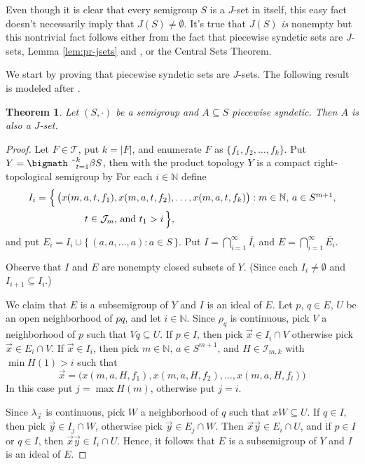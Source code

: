 \documentclass[12pt,showtrims]{memoir}
\theoremstyle{plain}
\newtheorem{thm}{Theorem}[section]
\theoremstyle{definition}
\newcommand{\bbN}{\mathbb{N}}
\newcommand{\calI}{\mathcal{I}}
\newcommand{\calJ}{\mathcal{J}}
\newcommand{\calT}{\mathcal{T}}
\newcommand{\bigtimes}{\hbox{\bigmath \char'2}}
\begin{document}
Even though it is clear that every semigroup $S$ is a $J$-set in itself, this easy fact doesn't necessarily imply that $J(S) \ne \emptyset$.
It's true that $J(S)$ \emph{is} nonempty but this nontrivial fact follows either from the fact that piecewise syndetic sets are $J$-sets, Lemma \ref{lem:pr-jsets} and \cite[Theorem 3.11]{Hindman:1998fk}, or the Central Sets Theorem. 

We start by proving that piecewise syndetic sets are $J$-sets.
The following result is modeled after \cite[Theorems 14.1 and 14.7]{Hindman:1998fk}. 

\begin{thm}
  Let $(S, \cdot)$ be a semigroup and $A \subseteq S$ piecewise syndetic.
  Then $A$ is also a $J$-set.
\end{thm}
\begin{proof}
  Let $F \in \calT$, put $k = |F|$, and enumerate $F$ as $\{f_1, f_2, \ldots, f_k\}$.
  Put $Y = \bigtimes_{t=1}^k \beta S$, then with the product topology $Y$ is a compact right-topological semigroup by \cite[Theorem 2.22]{Hindman:1998fk}
  For each $i \in \bbN$ define
  \begin{align*}
    I_i &= \Bigl\{\, \bigl( x(m, a, t, f_1), x(m, a, t, f_2), \ldots,
    x(m, a, t, f_k) \bigr) : \mbox{$m \in \bbN$, $a \in S^{m+1}$,} \\
    &\hspace{5em} \mbox{$t \in \calJ_m$, and $t_1 > i$}
    \,\Bigr\},
  \end{align*}
  and put $E_i = I_i \cup \{\, (a, a, \ldots, a) : a \in S \,\}$.
  Put $I = \bigcap_{i=1}^\infty \overline{I_i}$ and $E = \bigcap_{i=1}^\infty \overline{E_i}$.

  Observe that $I$ and $E$ are nonempty closed subsets of $Y$.
  (Since each $I_i \ne \emptyset$ and $I_{i+1} \subseteq I_i$.)

  We claim that $E$ is a subsemigroup of $Y$ and $I$ is an ideal of $E$.
  Let $p$, $q \in E$, $U$ be an open neighborhood of $pq$, and let $i \in \bbN$. 
  Since $\rho_q$ is continuous, pick $V$ a neighborhood of $p$ such that $Vq \subseteq U$. 
  If $p \in I$, then pick $\vec{x} \in I_i \cap V$ otherwise pick $\vec{x} \in E_i \cap V$.
  If $\vec{x} \in I_i$, then pick $m \in \bbN$, $a \in S^{m+1}$, and $H \in \calI_{m,k}$ with $\min H(1) > i$ such that
  \[
    \vec{x} = \bigl( x(m, a, H, f_1), x(m, a, H, f_2), \ldots, x(m,
    a, H, f_l) \bigr)
  \]
  In this case put $j = \max H(m)$, otherwise put $j=i$. 

  Since $\lambda_{\vec{x}}$ is continuous, pick $W$ a neighborhood of $q$ such that $xW \subseteq U$. 
  If $q \in I$, then pick $\vec{y} \in I_j \cap W$, otherwise pick $\vec{y} \in E_j \cap W$.
  Then $\vec{x} \vec{y} \in E_i \cap U$, and if $p \in I$ or $q \in I$, then $\vec{x} \vec{y} \in I_i \cap U$. 
  Hence, it follows that $E$ is a subsemigroup of $Y$ and $I$ is an ideal of $E$.


\end{proof}
\end{document}
